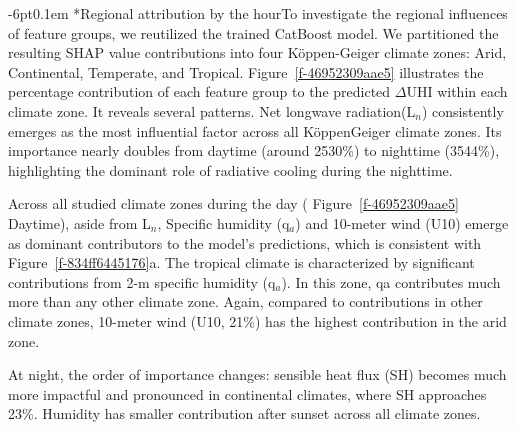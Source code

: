 \documentclass[]{nature}
\makeatletter
\renewcommand{\subsection}{\@startsection {subsection}{2}{0pt}%
    {-6pt}{0.1em}%
    {\fontsize{12pt}{14pt}\selectfont\sffamily\bfseries}%
    }
\makeatother
\begin{document}
\subsection*{Regional attribution by the hour}To investigate the regional influences of feature groups, we reutilized the trained CatBoost model. We partitioned the resulting SHAP value contributions into four K{\"{o}}ppen-Geiger climate zones: Arid, Continental, Temperate, and Tropical. Figure~\ref{f-46952309aae5}  illustrates the percentage contribution of each feature group to the predicted \ensuremath{\Delta }UHI within each climate zone.  It reveals several patterns. Net longwave radiation(L\ensuremath{_{n}}) consistently emerges as the most influential factor across all K{\"{o}}ppen{\textendash}Geiger climate zones. Its importance nearly doubles from daytime (around 25{\textendash}30\%) to nighttime (35{\textendash}44\%), highlighting the dominant role of radiative cooling during the nighttime.

Across all studied climate zones during the day ( Figure~\ref{f-46952309aae5} Daytime), aside from L\ensuremath{_{n}}, Specific humidity (q\ensuremath{_{a}}) and 10-meter wind (U10) emerge as dominant contributors to the model's predictions, which is consistent with Figure~\ref{f-834ff6445176}a. The tropical climate is characterized by significant contributions from 2-m specific humidity (q\ensuremath{_{a}}). In this zone, qa contributes much more than any other climate zone. Again, compared to contributions in other climate zones, 10-meter wind (U10, 21\%) has the highest contribution in the arid zone.

At night, the order of importance changes: sensible heat flux (SH) becomes much more impactful and pronounced in continental climates, where SH approaches 23\%. Humidity has smaller contribution after sunset across all climate zones.
\end{document}

